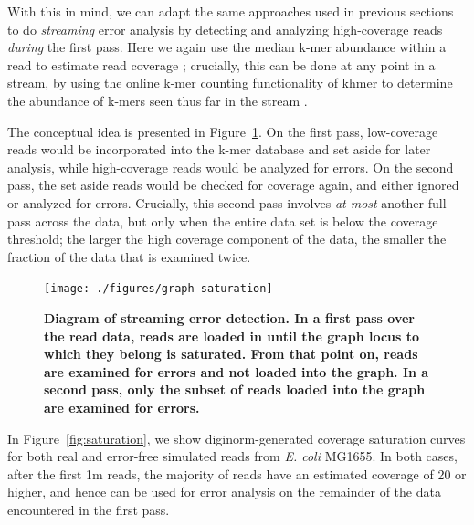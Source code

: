 \documentclass{article}
\begin{document}
With this in mind, we can adapt the same approaches used in previous
sections to do {\em streaming} error analysis by detecting and
analyzing high-coverage reads {\em during} the first pass.  Here we
again use the median k-mer abundance within a read to estimate read
coverage \cite{Brown2012}; crucially, this can be done at any point in
a stream, by using the online k-mer counting functionality of khmer to
determine the abundance of k-mers seen thus far in the stream
\cite{Zhang2014}.

The conceptual idea is presented in Figure~\ref{fig:concept}.  On the
first pass, low-coverage reads would be incorporated into the k-mer
database and set aside for later analysis, while high-coverage reads
would be analyzed for errors. On the second pass, the set aside reads
would be checked for coverage again, and either ignored or analyzed
for errors.  Crucially, this second pass involves {\em at most}
another full pass across the data, but only when the entire data set
is below the coverage threshold; the larger the high coverage
component of the data, the smaller the fraction of the data that is
examined twice.

\begin{figure}[!ht]
 \centerline{\texttt{[image: ./figures/graph-saturation]}}
\caption{\bf Diagram of streaming error detection. In a first pass
over the read data, reads are loaded in until the graph locus to which
they belong is saturated.  From that point on, reads are examined for
errors and not loaded into the graph.  In a second pass, only the subset
of reads loaded into the graph are examined for errors.}
\label{fig:concept}
\end{figure}

In Figure~\ref{fig:saturation}, we show diginorm-generated coverage
saturation curves for both real and error-free simulated reads from
{\em E. coli} MG1655.  In both cases, after the first 1m reads, the
majority of reads have an estimated coverage of 20 or higher, and
hence can be used for error analysis on the remainder of the data
encountered in the first pass.
\end{document}

